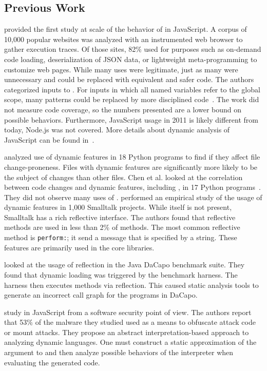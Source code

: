 \documentclass[screen,acmsmall]{acmart}%
\renewcommand{\k}[1]{\lstinline |#1|\xspace}
\begin{document}
\subsection{Previous Work}

\citet{ecoop11} provided the first study at scale of the behavior of \eval in
JavaScript. A corpus of 10,000 popular websites was analyzed with an
instrumented web browser to gather execution traces. Of those sites, 82\% used
\eval for purposes such as on-demand code loading, deserialization of JSON data,
or lightweight meta-programming to customize web pages. While many uses were
legitimate, just as many were unnecessary and could be replaced with equivalent
and safer code. The authors categorized inputs to \eval. For inputs in
which all named variables refer to the global scope, many patterns could be
replaced by more disciplined code~\cite{oopsla12b, moller12}. The work did not
measure code coverage, so the numbers presented are a lower bound on possible
behaviors. Furthermore, JavaScript usage in 2011 is likely different from today,
\eg Node.js was not covered. More details about dynamic analysis of JavaScript
can be found in~\cite{liang}.

\citet{wang} analyzed use of dynamic features in 18 Python programs to find if
they affect file change-proneness. Files with dynamic features are significantly
more likely to be the subject of changes than other files. Chen et al. looked
at the correlation between code changes and dynamic features, including \eval,
in 17 Python programs~\cite{chen}. They did not observe many uses of \eval.
\citet{oscar} performed an empirical study of the usage of dynamic features in
1,000 Smalltalk projects. While \eval itself is not present, Smalltalk has a
rich reflective interface. The authors found that reflective methods are used in less
than 2\% of methods. The most common reflective method is \k{perform:}; it send
a message that is specified by a string. These features are primarily used in the
core libraries.

\citet{bodden} looked at the usage of reflection in the Java DaCapo benchmark suite.
They found that dynamic loading was triggered by the benchmark harness. The
harness then executes methods via reflection. This caused static analysis tools
to generate an incorrect call graph for the programs in DaCapo.

\citet{Arceri21} study \eval in JavaScript from a software security point of
view. The authors report that 53\% of the malware they studied used \eval as a
means to obfuscate attack code or mount attacks. They propose an abstract
interpretation-based approach to analyzing dynamic languages. One must construct
a static approximation of the argument to \eval and then analyze possible
behaviors of the interpreter when evaluating the generated code.
\end{document}
